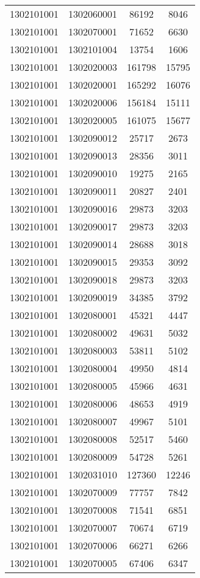 \begin{longtable}[h]{llcc}
		1302101001 & 1302060001 & 86192 & 8046\\
		1302101001 & 1302070001 & 71652 & 6630\\
		1302101001 & 1302101004 & 13754 & 1606\\
		1302101001 & 1302020003 & 161798 & 15795\\
		1302101001 & 1302020001 & 165292 & 16076\\
		1302101001 & 1302020006 & 156184 & 15111\\
		1302101001 & 1302020005 & 161075 & 15677\\
		1302101001 & 1302090012 & 25717 & 2673\\
		1302101001 & 1302090013 & 28356 & 3011\\
		1302101001 & 1302090010 & 19275 & 2165\\
		1302101001 & 1302090011 & 20827 & 2401\\
		1302101001 & 1302090016 & 29873 & 3203\\
		1302101001 & 1302090017 & 29873 & 3203\\
		1302101001 & 1302090014 & 28688 & 3018\\
		1302101001 & 1302090015 & 29353 & 3092\\
		1302101001 & 1302090018 & 29873 & 3203\\
		1302101001 & 1302090019 & 34385 & 3792\\
		1302101001 & 1302080001 & 45321 & 4447\\
		1302101001 & 1302080002 & 49631 & 5032\\
		1302101001 & 1302080003 & 53811 & 5102\\
		1302101001 & 1302080004 & 49950 & 4814\\
		1302101001 & 1302080005 & 45966 & 4631\\
		1302101001 & 1302080006 & 48653 & 4919\\
		1302101001 & 1302080007 & 49967 & 5101\\
		1302101001 & 1302080008 & 52517 & 5460\\
		1302101001 & 1302080009 & 54728 & 5261\\
		1302101001 & 1302031010 & 127360 & 12246\\
		1302101001 & 1302070009 & 77757 & 7842\\
		1302101001 & 1302070008 & 71541 & 6851\\
		1302101001 & 1302070007 & 70674 & 6719\\
		1302101001 & 1302070006 & 66271 & 6266\\
		1302101001 & 1302070005 & 67406 & 6347\\

\end{longtable}
